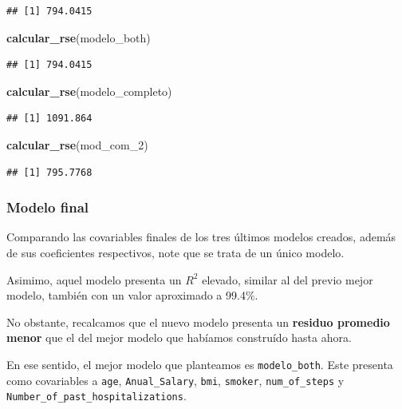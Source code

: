\documentclass[
]{article}
\newenvironment{Shaded}{\begin{snugshade}}{\end{snugshade}}
\newcommand{\FunctionTok}[1]{\textcolor[rgb]{0.13,0.29,0.53}{\textbf{#1}}}
\newcommand{\NormalTok}[1]{#1}
\begin{document}
\begin{verbatim}
## [1] 794.0415
\end{verbatim}

\begin{Shaded}
\begin{Highlighting}[]
\FunctionTok{calcular\_rse}\NormalTok{(modelo\_both)}
\end{Highlighting}
\end{Shaded}

\begin{verbatim}
## [1] 794.0415
\end{verbatim}

\begin{Shaded}
\begin{Highlighting}[]
\FunctionTok{calcular\_rse}\NormalTok{(modelo\_completo)}
\end{Highlighting}
\end{Shaded}

\begin{verbatim}
## [1] 1091.864
\end{verbatim}

\begin{Shaded}
\begin{Highlighting}[]
\FunctionTok{calcular\_rse}\NormalTok{(mod\_com\_2)}
\end{Highlighting}
\end{Shaded}

\begin{verbatim}
## [1] 795.7768
\end{verbatim}

\subsubsection{Modelo final}\label{modelo-final}

Comparando las covariables finales de los tres últimos modelos creados,
además de sus coeficientes respectivos, note que se trata de un único
modelo.

Asimimo, aquel modelo presenta un \(R^2\) elevado, similar al del previo
mejor modelo, también con un valor aproximado a 99.4\%.

No obstante, recalcamos que el nuevo modelo presenta un \textbf{residuo
promedio menor} que el del mejor modelo que habíamos construído hasta
ahora.

En ese sentido, el mejor modelo que planteamos es \texttt{modelo\_both}.
Este presenta como covariables a \texttt{age}, \texttt{Anual\_Salary},
\texttt{bmi}, \texttt{smoker}, \texttt{num\_of\_steps} y
\texttt{Number\_of\_past\_hospitalizations}.
\end{document}
